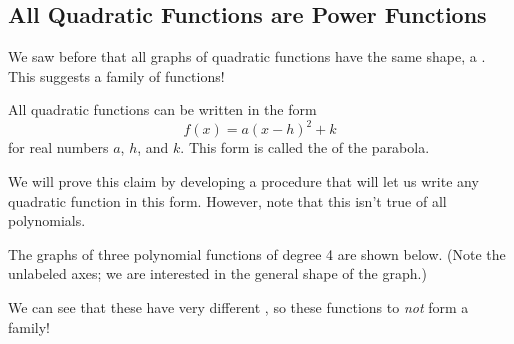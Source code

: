 \subsection{All Quadratic Functions are Power Functions} 
We saw before that all graphs of quadratic functions have the same shape, a \makeblank[1.5in]. This suggests a family of functions!
\begin{fact}
All quadratic functions can be written in the form
$$f(x)=a(x-h)^2+k$$
for real numbers $a$, $h$, and $k$. This form is called the  of the parabola.
\end{fact}
We will prove this claim by developing a procedure that will let us write any quadratic function in this form. However, note that this isn't true of all polynomials.
\begin{Example}
The graphs of three polynomial functions of degree 4 are shown below. (Note the unlabeled axes; we are interested in the general shape of the graph.)
\begin{center}\end{center}
We can see that these have very different \makeblank[1in], so these functions to \emph{not} form a family!
\end{Example}
